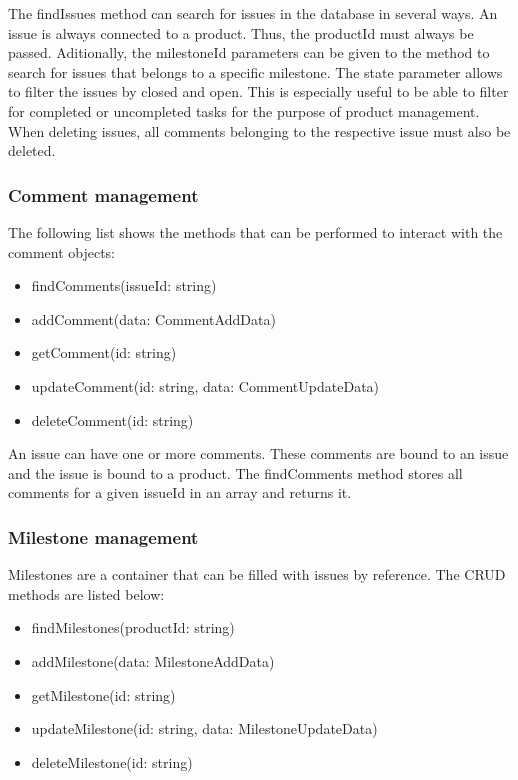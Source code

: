     The findIssues method can search for issues in the database in several ways. An issue is always connected to a product. Thus, the productId must always be passed. Aditionally, the milestoneId parameters can be given to the method to search for issues that belongs to a specific milestone. The state parameter allows to filter the issues by closed and open. This is especially useful to be able to filter for completed or uncompleted tasks for  the purpose of product management. When deleting issues, all comments belonging to the respective issue must also be deleted.

    \subsubsection*{Comment management}
    The following list shows the methods that can be performed to interact with the comment objects:
    \begin{itemize}
        \item findComments(issueId: string)
        \item addComment(data: CommentAddData)
        \item getComment(id: string)
        \item updateComment(id: string, data: CommentUpdateData)
        \item deleteComment(id: string)
    \end{itemize}

    An issue can have one or more comments. These comments are bound to an issue and the issue is bound to a product. The findComments method stores all comments for a given issueId in an array and returns it. 

    \subsubsection*{Milestone management}
    Milestones are a container that can be filled with issues by reference. The CRUD methods are listed below:
    \begin{itemize}
        \item findMilestones(productId: string)
        \item addMilestone(data: MilestoneAddData)
        \item getMilestone(id: string)
        \item updateMilestone(id: string, data: MilestoneUpdateData)
        \item deleteMilestone(id: string)
    \end{itemize}

